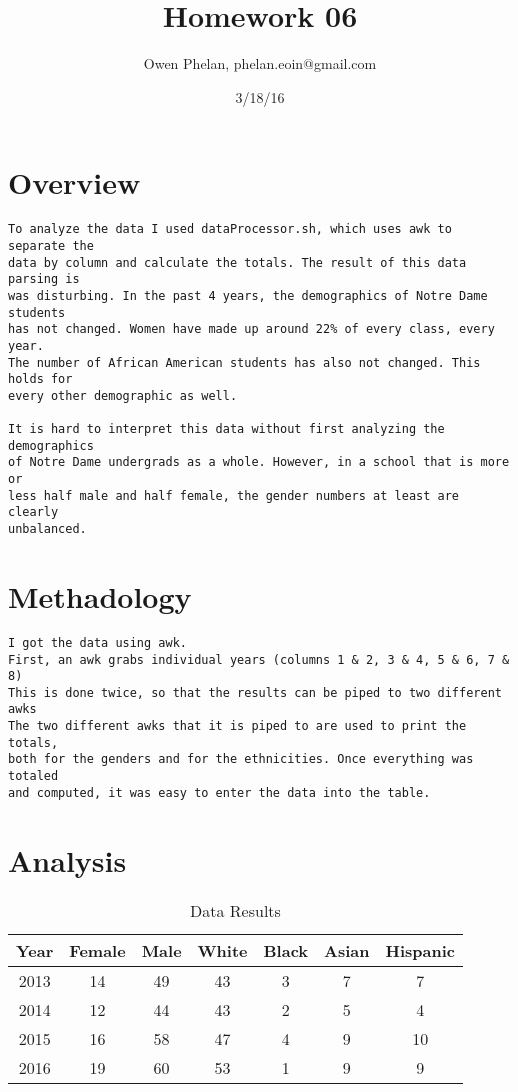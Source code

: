 \documentclass{article}
\title{Homework 06}
\date{3/18/16}
\author{Owen Phelan, phelan.eoin@gmail.com}
\begin{document}
	\maketitle
	\section{Overview}
	\begin{verbatim}
To analyze the data I used dataProcessor.sh, which uses awk to separate the 
data by column and calculate the totals. The result of this data parsing is 
was disturbing. In the past 4 years, the demographics of Notre Dame students 
has not changed. Women have made up around 22% of every class, every year. 
The number of African American students has also not changed. This holds for
every other demographic as well. 

It is hard to interpret this data without first analyzing the demographics
of Notre Dame undergrads as a whole. However, in a school that is more or 
less half male and half female, the gender numbers at least are clearly 
unbalanced. 

	\end{verbatim}
	\section{Methadology}
	\begin{verbatim}
I got the data using awk. 
First, an awk grabs individual years (columns 1 & 2, 3 & 4, 5 & 6, 7 & 8)
This is done twice, so that the results can be piped to two different awks
The two different awks that it is piped to are used to print the totals, 
both for the genders and for the ethnicities. Once everything was totaled 
and computed, it was easy to enter the data into the table.

	\end{verbatim}
	\newpage
	\section*{Analysis}
	\begin{table}[h!]
	    \centering
	    \begin{tabular}{c|c|c|c|c|c|c}
	    Year	& 	 Female &  Male & White & Black & Asian & Hispanic\\
	    \hline
	    2013		& 	14 	& 	49 	& 	43 	& 	3 	& 	7 	& 	7\\
	    2014		& 	12 	& 	44 	& 	43 	& 	2 	& 	5 	& 	4\\
	    2015		& 	16 	& 	58 	& 	47 	& 	4 	& 	9 	& 	10\\
	    2016		& 	19 	&	60 	& 	53 	&	1 	& 	9 	& 	9\\
	    \end{tabular}
	    \caption{Data Results}
	    \label{tbl:Data Results}
	\end{table}
\end{document}
